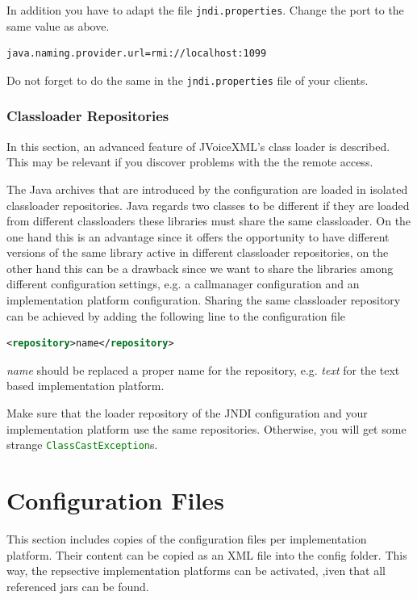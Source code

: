 \documentclass[11pt,a4paper]{book}
\begin{document}
In addition you have to adapt the file \texttt{jndi.properties}.
Change the port to the same value as above.

\begin{lstlisting}
java.naming.provider.url=rmi://localhost:1099
\end{lstlisting}

Do not forget to do the same in the \texttt{jndi.properties} file of your
clients.

\subsection{Classloader Repositories}
\label{sec:classloader-repositories}

In this section, an advanced feature of JVoiceXML's class loader is described.
This may be relevant if you discover problems with the the remote access.

The Java archives that are introduced by the configuration are loaded
in isolated classloader repositories. Java regards two classes to be different if they are
loaded from different classloaders these libraries must share the same
classloader. On the one hand this is an advantage since it offers the opportunity
to have different versions of the same library active in different classloader
repositories, on the other hand this can be a drawback since we want to share the
libraries among different configuration settings, e.g. a callmanager
configuration and an implementation platform configuration. Sharing the same
classloader repository can be achieved by adding the following line to the
configuration file

\begin{lstlisting}[language=XML]
<repository>name</repository>
\end{lstlisting}

\emph{name} should be replaced a proper name for the repository, e.g.
\emph{text} for the text based implementation platform.

Make sure that the loader repository of the JNDI configuration and your
implementation platform use the same repositories. Otherwise, you will get some
strange \lstinline[language=Java]{ClassCastException}s.

\appendix
\chapter{Configuration Files}
\label{sec:configuration-files}

This section includes copies of the configuration files per
implementation platform. Their content can be copied as an XML file
into the config folder. This way, the repsective implementation
platforms can be activated, ,iven that all referenced jars can be found.
\end{document}
